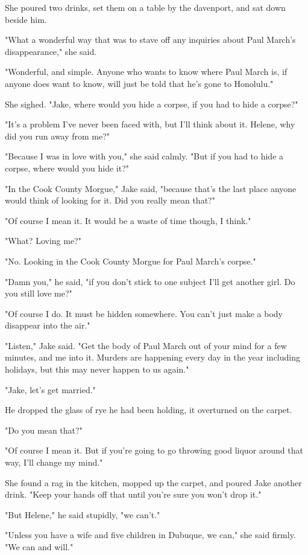 \documentclass{novel}
\begin{document}
She poured two drinks, set them on a table by the davenport, and sat down beside him.

"What a wonderful way that was to stave off any inquiries about Paul March's disappearance," she said.

"Wonderful, and simple. Anyone who wants to know where Paul March is, if anyone does want to know, will just be told that he's gone to Honolulu."

She sighed. "Jake, where would you hide a corpse, if you had to hide a corpse?"

"It's a problem I've never been faced with, but I'll think about it. Helene, why did you run away from me?"

"Because I was in love with you," she said calmly. "But if you had to hide a corpse, where would you hide it?"

"In the Cook County Morgue," Jake said, "because that's the last place anyone would think of looking for it. Did you really mean that?"

"Of course I mean it. It would be a waste of time though, I think."

"What? Loving me?"

"No. Looking in the Cook County Morgue for Paul March's corpse."

"Damn you," he said, "if you don't stick to one subject I'll get another girl. Do you still love me?"

"Of course I do. It must be hidden somewhere. You can't just make a body disappear into the air."

"Listen," Jake said. "Get the body of Paul March out of your mind for a few minutes, and me into it. Murders are happening every day in the year including holidays, but this may never happen to us again."

"Jake, let's get married."

He dropped the glass of rye he had been holding, it overturned on the carpet.

"Do you mean that?"

"Of course I mean it. But if you're going to go throwing good liquor around that way, I'll change my mind."

She found a rag in the kitchen, mopped up the carpet, and poured Jake another drink. "Keep your hands off that until you're sure you won't drop it."

"But Helene," he said stupidly, "we can't."

"Unless you have a wife and five children in Dubuque, we can," she said firmly. "We can and will."
\end{document}
